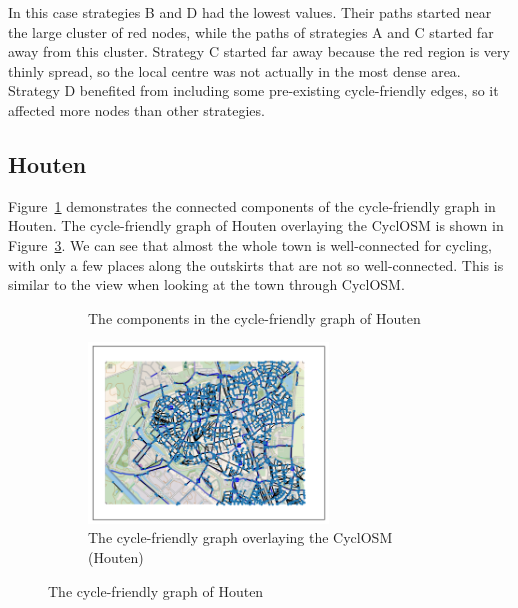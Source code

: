 \documentclass[12pt,a4paper]{report}
\begin{document}
In this case strategies B and D had the lowest values. Their paths started near the large cluster of red nodes, while the paths of strategies A and C started far away from this cluster. Strategy C started far away because the red region is very thinly spread, so the local centre was not actually in the most dense area. Strategy D benefited from including some pre-existing cycle-friendly edges, so it affected more nodes than other strategies.

\subsection{Houten}\label{sec:houten}
Figure~\ref{fig:components houten} demonstrates the connected components of the cycle-friendly graph in Houten. The cycle-friendly graph of Houten overlaying the CyclOSM is shown in Figure~\ref{fig:overlay houten}. We can see that almost the whole town is well-connected for cycling, with only a few places along the outskirts that are not so well-connected. This is similar to the view when looking at the town through CyclOSM.

\begin{figure}[ht!]
    \begin{subfigure}{\textwidth}
        \centering
         {
            
        }
        \caption{The components in the cycle-friendly graph of Houten}
        \label{fig:components houten}
    \end{subfigure}
    \hfill
    \begin{subfigure}{\textwidth}
        \centering
        \includegraphics[width=0.7\textwidth,trim={1cm 1cm 1cm 1cm},clip]{diss_images/eval/overlay_houten.png}
        \caption{The cycle-friendly graph overlaying the CyclOSM (Houten)}
        \label{fig:overlay houten}
    \end{subfigure}
    \caption{The cycle-friendly graph of Houten}
\end{figure}
\end{document}
